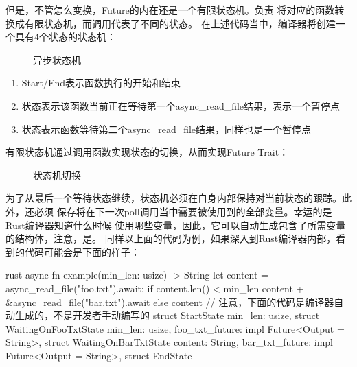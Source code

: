 但是，不管怎么变换，Future的内在还是一个有限状态机。负责
将对应的函数转换成有限状态机，而调用代表了不同的状态。
在上述代码当中，编译器将创建一个具有4个状态的状态机：
\begin{figure}[H]
  \centering
  
  \caption{异步状态机\protect\footnotemark}
  \label{fig:async-state-machine-states}
\end{figure}
\begin{enumerate}
  \item Start/End表示函数执行的开始和结束
  \item {}状态表示该函数当前正在等待第一个async\_read\_file结果，表示一个暂停点
  \item {}状态表示函数等待第二个async\_read\_file结果，同样也是一个暂停点
\end{enumerate}

有限状态机通过调用函数实现状态的切换，从而实现Future Trait：
\begin{figure}[H]
  \centering
  \begin{minipage}{\textwidth}
  
  \caption{状态机切换\protect\footnotemark}
  \label{fig:async-state-machine-basic}
  \end{minipage}
\end{figure}

为了从最后一个等待状态继续，状态机必须在自身内部保持对当前状态的跟踪。此外，还必须
保存将在下一次poll调用当中需要被使用到的全部变量。幸运的是Rust编译器知道什么时候
使用哪些变量，因此，它可以自动生成包含了所需变量的结构体，注意，是。
同样以上面的代码为例，如果深入到Rust编译器内部，看到的代码可能会是下面的样子：
\begin{code-block}{rust}
async fn example(min_len: usize) -> String {
    let content = async_read_file("foo.txt").await;
    if content.len() < min_len {
        content + &async_read_file("bar.txt").await
    } else {
        content
    }
}
// 注意，下面的代码是编译器自动生成的，不是开发者手动编写的
struct StartState {
    min_len: usize,
}
struct WaitingOnFooTxtState {
    min_len: usize,
    foo_txt_future: impl Future<Output = String>,
}
struct WaitingOnBarTxtState {
    content: String,
    bar_txt_future: impl Future<Output = String>,
}
struct EndState {}
\end{code-block}

